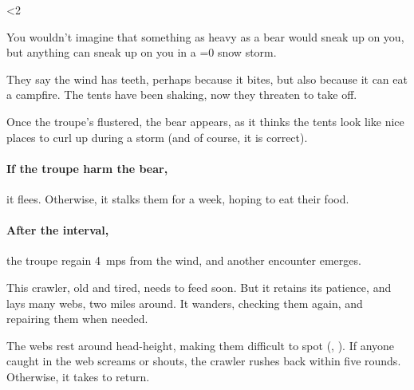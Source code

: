 \ifnum\value{temperature}<2

\bear

You wouldn't imagine that something as heavy as a bear would sneak up on you, but anything can sneak up on you in a
\ifnum\value{temperature}=0
  \gls{snow}
\fi
storm.

\begin{boxtext}
  They say the wind has teeth, perhaps because it bites, but also because it can eat a campfire.
  The tents have been shaking, now they threaten to take off.
\end{boxtext}

Once the troupe's flustered, the bear appears, as it thinks the tents look like nice places to curl up during a storm (and of course, it is correct).

\paragraph{If the troupe harm the bear,}
it flees.
Otherwise, it stalks them for a week, hoping to eat their food.

\paragraph{After the \gls{interval},}
the troupe regain 4~\glspl{mp} from the wind, and another encounter emerges.

\else

This \gls{crawler}, old and tired, needs to feed soon.
But it retains its patience, and lays many webs, two miles around.
It wanders, checking them again, and repairing them when needed.

\chitincrawler
\label{crawlerStatblock}

The webs rest around head-height, making them difficult to spot (, \tn[10]).
If anyone caught in the web screams or shouts, the \gls{crawler} rushes back within five \glspl{round}.
Otherwise, it takes  to return.

\fi
